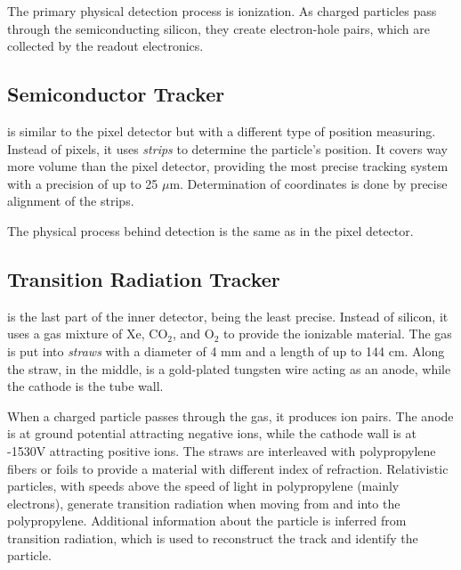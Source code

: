 The primary physical detection process is ionization.
As charged particles pass through the semiconducting silicon, they create electron-hole pairs, which are collected by the readout electronics.

\subsection{Semiconductor Tracker}
\SCT is similar to the pixel detector but with a different type of position measuring.
Instead of pixels, it uses  \emph{strips} to determine the particle's position.
It covers way more volume than the pixel detector, providing the most precise tracking system with a precision of up to 25 $\mu$m.
Determination of coordinates is done by precise alignment of the strips.

The physical process behind detection is the same as in the pixel detector.

\subsection{Transition Radiation Tracker}
\TRT is the last part of the inner detector, being the least precise.
Instead of silicon, it uses a gas mixture of Xe, CO$_2$, and O$_2$ to provide the ionizable material.
The gas is put into \emph{straws} with a diameter of 4 mm and a length of up to 144 cm.
Along the straw, in the middle, is a gold-plated tungsten wire acting as an anode, while the cathode is the tube wall.

When a charged particle passes through the gas, it produces ion pairs.
The anode is at ground potential attracting negative ions, while the cathode wall is at -1530V attracting positive ions.
The straws are interleaved with polypropylene fibers or foils to provide a material with different index of refraction.
Relativistic particles, with speeds above the speed of light in polypropylene (mainly electrons), generate transition radiation when moving from and into the polypropylene. 
Additional information about the particle is inferred from transition radiation, which is used to reconstruct the track and identify the particle. 



